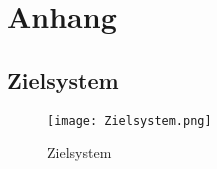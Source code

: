 \section{Anhang}
\label{sec:Anhang}

\subsection{Zielsystem}

\begin{figure}[htb] 
\centering
\texttt{[image: Zielsystem.png]}
\caption[Zielsystem]{Zielsystem\protect\footnotemark}
\label{fig:Zielsystem}
\end{figure}
